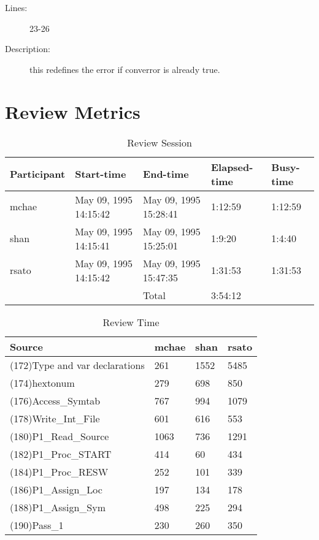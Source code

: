 \begin{enumerate}
\begin{description}
\item [Lines:] 23-26

\item [Description:] this redefines the error if converror is
already true.
\end{description}
\end{enumerate}
\section{Review Metrics}
\begin{table}[hb]
\begin{center}
\begin{tabular}{|l|l|l|l|l|}
\hline
Participant & Start-time & End-time & Elapsed-time & Busy-time \\
\hline
mchae & May 09, 1995 14:15:42 & May 09, 1995 15:28:41 & 1:12:59 & 1:12:59 \\
shan & May 09, 1995 14:15:41 & May 09, 1995 15:25:01 & 1:9:20 & 1:4:40 \\
rsato & May 09, 1995 14:15:42 & May 09, 1995 15:47:35 & 1:31:53 & 1:31:53 \\
\hline
 & & Total & 3:54:12 & \\
\hline
\end{tabular}
\end{center}
\caption{Review Session}
\end{table}


\begin{table}[hb]
\begin{center}
\begin{tabular}{|l|l|l|l|}
\hline
Source & mchae & shan & rsato\\
\hline
(172)Type and var declarations & 261 & 1552 & 5485\\
(174)hextonum & 279 & 698 & 850\\
(176)Access\_Symtab & 767 & 994 & 1079\\
(178)Write\_Int\_File & 601 & 616 & 553\\
(180)P1\_Read\_Source & 1063 & 736 & 1291\\
(182)P1\_Proc\_START & 414 & 60 & 434\\
(184)P1\_Proc\_RESW & 252 & 101 & 339\\
(186)P1\_Assign\_Loc & 197 & 134 & 178\\
(188)P1\_Assign\_Sym & 498 & 225 & 294\\
(190)Pass\_1 & 230 & 260 & 350\\
\hline
\end{tabular}
\end{center}
\caption{Review Time}
\end{table}

